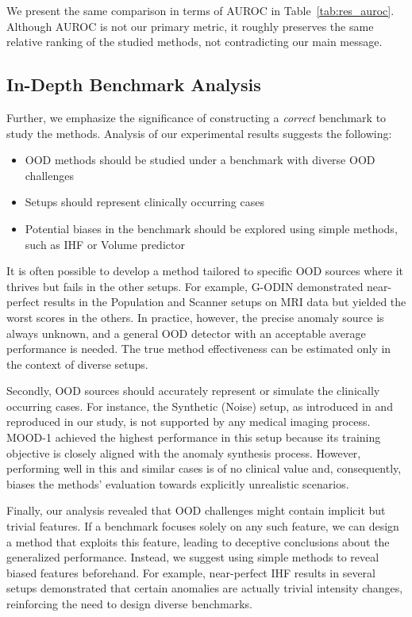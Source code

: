 We present the same comparison in terms of AUROC in Table~\ref{tab:res_auroc}. Although AUROC is not our primary metric, it roughly preserves the same relative ranking of the studied methods, not contradicting our main message.




\subsection{In-Depth Benchmark Analysis}

Further, we emphasize the significance of constructing a \textit{correct} benchmark to study the methods. Analysis of our experimental results suggests the following:

\begin{itemize}	
	\item OOD methods should be studied under a benchmark with diverse OOD challenges
	\item Setups should represent clinically occurring cases
	\item Potential biases in the benchmark should be explored using simple methods, such as IHF or Volume predictor
\end{itemize}

It is often possible to develop a method tailored to specific OOD sources where it thrives but fails in the other setups. For example, G-ODIN demonstrated near-perfect results in the Population and Scanner setups on MRI data but yielded the worst scores in the others. In practice, however, the precise anomaly source is always unknown, and a general OOD detector with an acceptable average performance is needed. The true method effectiveness can be estimated only in the context of diverse setups.

Secondly, OOD sources should accurately represent or simulate the clinically occurring cases. For instance, the Synthetic (Noise) setup, as introduced in \cite{zimmerer2022mood} and reproduced in our study, is not supported by any medical imaging process. MOOD-1 achieved the highest performance in this setup because its training objective is closely aligned with the anomaly synthesis process. However, performing well in this and similar cases is of no clinical value and, consequently, biases the methods' evaluation towards explicitly unrealistic scenarios.

Finally, our analysis revealed that OOD challenges might contain implicit but trivial features. If a benchmark focuses solely on any such feature, we can design a method that exploits this feature, leading to deceptive conclusions about the generalized performance. Instead, we suggest using simple methods to reveal biased features beforehand. For example, near-perfect IHF results in several setups demonstrated that certain anomalies are actually trivial intensity changes, reinforcing the need to design diverse benchmarks.

